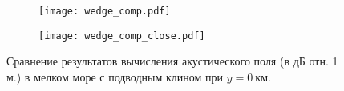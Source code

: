 \documentclass[../document.tex]{subfiles}
\begin{document}
                \begin{figure}[h]
                    \centering
                    \begin{subfigure}[t]{0.9\textwidth}
                        \centering
                        \texttt{[image: wedge\_comp.pdf]}
                    \end{subfigure}
                    \hfill
                    \begin{subfigure}[t]{0.9\textwidth}
                        \centering
                        \texttt{[image: wedge\_comp\_close.pdf]}
                    \end{subfigure}
                    \caption{Сравнение результатов вычисления акустического поля (в дБ отн. 1 м.) в мелком море с подводным клином при $y=0\ \text{км}$.\label{fig::wedge_compare}}
                \end{figure}
                \FloatBarrier
\end{document}
